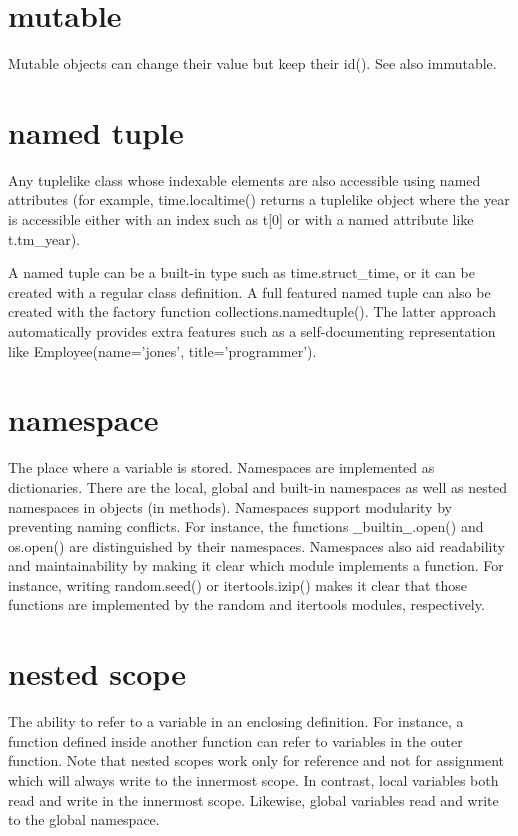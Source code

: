 \documentclass[12pt,a4paper,final,twoside,onecolumn,titlepage]{book}
\begin{document}
\section{mutable}
Mutable objects can change their value but keep their id(). See also immutable.

\section{named tuple}
Any tuple\-like class whose indexable elements are also accessible using named attributes (for example, time.localtime() returns a tuple\-like object where the year is accessible either with an index such as t[0] or with a named attribute like t.tm\_year).

A named tuple can be a built-in type such as time.struct\_time, or it can be created with a regular class definition. A full featured named tuple can also be created with the factory function collections.namedtuple(). The latter approach automatically provides extra features such as a self-documenting representation like Employee(name='jones', title='programmer').

\section{namespace}
The place where a variable is stored. Namespaces are implemented as dictionaries. There are the local, global and built-in namespaces as well as nested namespaces in objects (in methods). Namespaces support modularity by preventing naming conflicts. For instance, the functions $\_\_$builtin$\_\_$.open() and os.open() are distinguished by their namespaces. Namespaces also aid readability and maintainability by making it clear which module implements a function. For instance, writing random.seed() or itertools.izip() makes it clear that those functions are implemented by the random and itertools modules, respectively.

\section{nested scope}
The ability to refer to a variable in an enclosing definition. For instance, a function defined inside another function can refer to variables in the outer function. Note that nested scopes work only for reference and not for assignment which will always write to the innermost scope. In contrast, local variables both read and write in the innermost scope. Likewise, global variables read and write to the global namespace.
\end{document}
